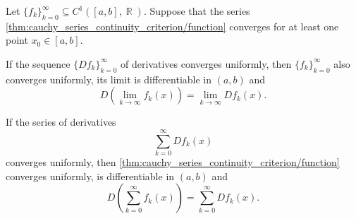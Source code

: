 \begin{corollary}\label{thm:derivative_limit_exchange}
  Let \( \{ f_k \}_{k=0}^\infty \subseteq C^1([a, b], \BbbR) \). Suppose that the series \cref{thm:cauchy_series_continuity_criterion/function} converges for at least one point \( x_0 \in [a, b] \).

  \begin{thmenum}
     If the sequence \( \{ D f_k \}_{k=0}^\infty \) of derivatives converges uniformly, then \( \{ f_k \}_{k=0}^\infty \) also converges uniformly, its limit is differentiable in \( (a, b) \) and
    \begin{equation*}
      D\left(\lim_{k \to \infty} f_k(x) \right) = \lim_{k \to \infty} D f_k(x).
    \end{equation*}

     If the series of derivatives
    \begin{equation}\label{thm:derivative_limit_exchange/derivative_series}
      \sum_{k=0}^\infty D f_k(x)
    \end{equation}
    converges uniformly, then \cref{thm:cauchy_series_continuity_criterion/function} converges uniformly, is differentiable in \( (a, b) \) and
    \begin{equation*}
      D\left(\sum_{k=0}^\infty f_k(x)\right) = \sum_{k=0}^\infty D f_k(x).
    \end{equation*}
  \end{thmenum}
\end{corollary}
